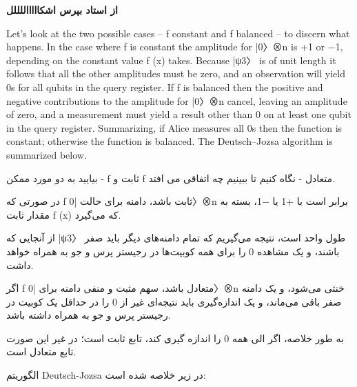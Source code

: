 \documentclass{book}
\begin{document}
	
	
	
	
	\textbf{از استاد بپرس اشکاااااللللل}
	
	Let’s look at the two possible cases – f constant and f balanced – to
	discern what happens. In the case where f is constant the amplitude for |0〉⊗n is +1 or
	−1, depending on the constant value f (x) takes. Because |ψ3〉 is of unit length it follows
	that all the other amplitudes must be zero, and an observation will yield 0s for all qubits
	in the query register. If f is balanced then the positive and negative contributions to the
	amplitude for |0〉⊗n cancel, leaving an amplitude of zero, and a measurement must yield
	a result other than 0 on at least one qubit in the query register. Summarizing, if Alice measures all 0s then the function is constant; otherwise the function is balanced. The
	Deutsch–Jozsa algorithm is summarized below.
	
	
	بیایید به دو مورد ممکن - f ثابت و f متعادل - نگاه کنیم تا ببینیم چه اتفاقی می افتد.
	
	در صورتی که f ثابت باشد، دامنه برای حالت |0〉⊗n برابر است با +1 یا −1، بسته به مقدار ثابت f (x) که می‌گیرد.
	
	از آنجایی که |ψ3〉 طول واحد است، نتیجه می‌گیریم که تمام دامنه‌های دیگر باید صفر باشند، و یک مشاهده 0 را برای همه کوبیت‌ها در رجیستر پرس و جو به همراه خواهد داشت.
	
	اگر f متعادل باشد، سهم مثبت و منفی دامنه برای |0〉⊗n خنثی می‌شود، و یک دامنه صفر باقی می‌ماند، و یک اندازه‌گیری باید نتیجه‌ای غیر از 0 را در حداقل یک کوبیت در رجیستر پرس و جو به همراه داشته باشد.
	
	به طور خلاصه، اگر الی همه 0 را اندازه گیری کند، تابع ثابت است؛ در غیر این صورت تابع متعادل است.
	
	الگوریتم Deutsch-Jozsa در زیر خلاصه شده است:
	
	
	
	
	
\end{document}
